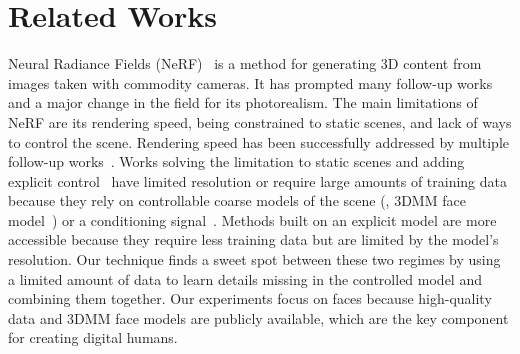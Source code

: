 \section{Related Works}
  \label{sec:blendfields-related}
  Neural Radiance Fields (NeRF)~\cite{mildenhall2020nerf} is a method for
  generating 3D content from images taken with commodity cameras.
  It has prompted many follow-up works
  \cite{zhang2020nerf++,park2021nerfies,martin2021nerfw,barron2021mip,barron2022mip,verbin2022ref,tancik2022block,huang2022hdr,suhail2022light,xiangli2021citynerf,mildenhall2022nerf,rematas2022urban}
  and a major change in the field for its photorealism.
  The main limitations of NeRF are its rendering speed, being constrained to
  static scenes, and lack of ways to control the scene.
  Rendering speed has been successfully addressed by multiple follow-up
  works~\cite{hedman2021baking,garbin2021fastnerf,yu2021plenoctrees}.
  Works solving the limitation to static
  scenes\cite{xian2021space,athar2022rignerf,noguchi2022watch,wang2022fourier,attal2021torf,weng2022humannerf,zhao2022humannerf,jiang2022neuman}
  and adding explicit
  control~\cite{kania2022conerf,wang2022clip,kim2022ae,cheng2022cross,yuan2022nerf,sun2022fenerf,yang2022neumesh}
  have limited resolution or require large amounts of training data because they
  rely on controllable coarse models of the scene (\eg, 3DMM face
  model~\cite{blanz1999morphable}) or a conditioning
  signal~\cite{park2021hypernerf}.
  Methods built on an explicit model are more accessible because they require
  less training data but are limited by the model's resolution.
  Our technique finds a sweet spot between these two regimes by using a limited
  amount of data to learn details missing in the controlled model and combining
  them together.
  Our experiments focus on faces because high-quality data and 3DMM face models
  are publicly available, which are the key component for creating digital
  humans.

